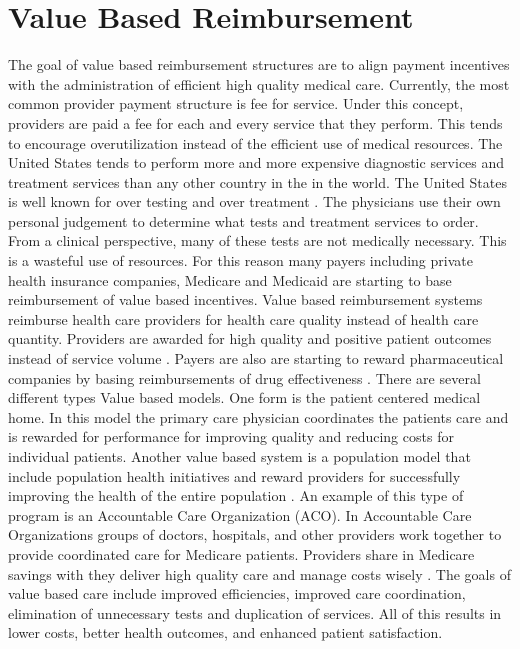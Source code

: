 \documentclass[sigconf]{acmart}
\begin{document}
\section{Value Based Reimbursement}
The goal of value based reimbursement structures are to align payment incentives with the administration of efficient high quality medical care. 
Currently, the most common provider payment structure is fee for service. Under this concept, providers are paid a fee for each and every service that they perform. This tends to encourage overutilization instead of the efficient use of medical resources. The United States tends to perform more and more expensive diagnostic services and treatment services than any other country in the in the world. The United States is well known for over testing and over treatment \cite{www-google-PBSO}. The physicians use their own personal judgement to determine what tests and treatment services to order.  From a clinical perspective, many of these tests are not medically necessary. This is a wasteful use of resources. 
For this reason many payers including private health insurance companies, Medicare and Medicaid are starting to base reimbursement of value based incentives.  Value based reimbursement systems reimburse health care providers for health care quality instead of health care quantity. Providers are awarded for high quality and positive patient outcomes instead of service volume \cite{www-google-McDonald}.  Payers are also are starting to reward pharmaceutical companies by basing reimbursements of drug effectiveness \cite{www-google-McKinsey}. 
There are several different types Value based models. One form is the patient centered medical home. In this model the primary care physician coordinates the patients care and is rewarded for performance for improving quality and reducing costs for individual patients. Another value based system is a population model that include population health initiatives and reward providers for successfully improving the health of the entire population \cite{www-google-liason}. An example of this type of program is an Accountable Care Organization (ACO). In Accountable Care Organizations groups of doctors, hospitals, and other providers work together to provide coordinated care for Medicare patients. Providers share in Medicare savings with they deliver high quality care and manage costs wisely \cite{www-google-ACO}.
The goals of value based care include improved efficiencies, improved care coordination, elimination of unnecessary tests and duplication of services.  All of this results in lower costs, better health outcomes, and enhanced patient satisfaction. 
\end{document}
